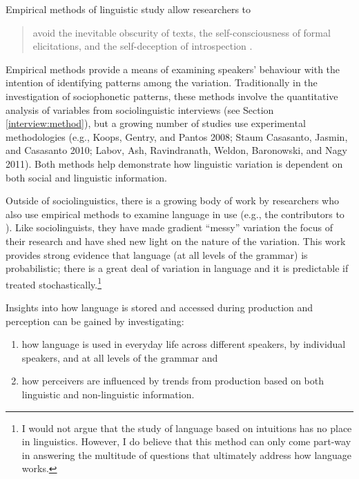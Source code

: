 Empirical methods of linguistic study allow researchers to

\begin{quote}
avoid the inevitable obscurity of texts, the self-con\-scious\-ness of formal elicitations, and the self-deception of introspection \cite[xix]{labov1972sociolingpatterns}.
\end{quote}

\noindent Empirical methods provide a means of examining speakers' behaviour with the intention of identifying patterns among the variation.  Traditionally in the investigation of sociophonetic patterns, these methods involve the quantitative analysis of variables from sociolinguistic interviews (see Section \ref{interview:method}), but a growing number of studies use experimental methodologies (e.g., Koops, Gentry, and Pantos 2008; Staum Casasanto, Jasmin, and Casasanto 2010; Labov, Ash, Ravindranath, Weldon, Baronowski, and Nagy 2011).  Both methods help demonstrate how linguistic variation is dependent on both social and linguistic information. \nocite{koopsetal2008} \nocite{staumcasasantoetal2010} \nocite{labovetal2011}


Outside of sociolinguistics, there is a growing body of work by researchers who also use empirical methods to examine  language in use (e.g., the contributors to ). Like sociolinguists, they have made gradient ``messy'' variation the focus of their research and have shed new light on the nature of the variation.  This work provides strong evidence that language (at all levels of the grammar) is probabilistic; there is a great deal of variation in language and it is predictable if treated stochastically.\footnote{I would not argue that the study of language based on intuitions has no place in linguistics.  However, I do believe that this method can only come part-way in answering the multitude of questions that ultimately address how language works.}

Insights into how language is stored and accessed during production and perception can be gained by investigating: \nocite{saussure1916}   

\begin{enumerate}
	\item how language is used in everyday life across different speakers, by individual speakers, and at all levels of the grammar and
	\item how perceivers are influenced by trends from production based on both linguistic and non-linguistic information.
\end{enumerate}

